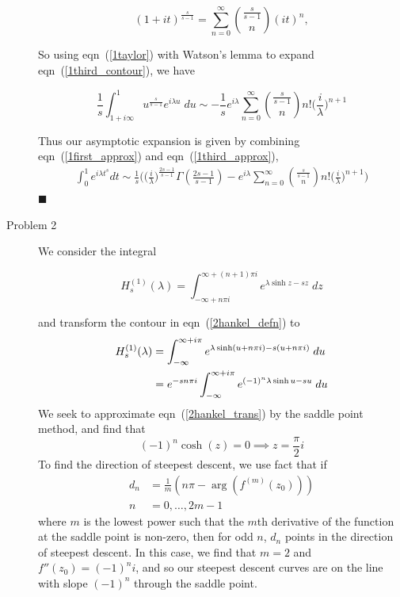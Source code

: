 \documentclass[11pt]{article}
\newcommand{\eq}[1]{\begin{align*}#1\end{align*}}
\newcommand{\eqn}[2]{
  \begin{equation}
    \label{#1}
    #2
  \end{equation}
}
\newcommand{\lam}{\lambda}
\newcommand{\eqr}[1]{eqn~(\ref{#1})}
\begin{document}
\begin{description}
\eqn{1taylor}{
  (1 + it)^\frac{s}{s-1} = 
  \sum_{n=0}^\infty
  \binom{\frac{s}{s-1}}{n}
  (it)^n,
}
So using \eqr{1taylor} with Watson's lemma to expand \eqr{1third_contour}, we have
\eqn{1third_approx}{
  \frac{1}{s} \int_{1+i\infty}^{1} u^\frac{s}{s-1} e^{i\lam u} \; du
  \sim
  -\frac{1}{s}
  e^{i\lam}
  \sum_{n=0}^\infty
  \binom{\frac{s}{s-1}}{n}
  n!
  \bigg(\frac{i}{\lam}\bigg)^{n+1}
}
Thus our asymptotic expansion is given by combining \eqr{1first_approx} and \eqr{1third_approx},
\eq{
  \int_0^1 e^{i\lam t^s} dt
  \sim
  \frac{1}{s}
  \Bigg(
    \bigg(\frac{i}{\lam}\bigg)^\frac{2s-1}{s-1}
    \Gamma(
      \frac{2s-1}{s-1}
    )
    -
    e^{i\lam}
    \sum_{n=0}^\infty
    \binom{\frac{s}{s-1}}{n}
    n!
    \bigg(\frac{i}{\lam}\bigg)^{n+1}
  \Bigg)
}
\hfill $\blacksquare$
\item[Problem 2]
We consider the integral
\eqn{2hankel_defn}{
  H_s^{(1)}(\lam) = \int_{
    -\infty + n\pi i
  }^{
    \infty + (n+1)\pi i
  }
  e^{
    \lam\sinh z - sz
  }
  \; dz
}
and transform the contour in \eqr{2hankel_defn} to
\begin{align}
  \notag
  H_s^{(1)}(\lam) &= \int
  _{-\infty}
  ^{\infty + i\pi}
  e^{
    \lam \sinh(u + n\pi i) - s(u + n\pi i)
  }
  \; du
  \\
  \label{2hankel_trans}
  &=
  e^{-sn\pi i}
  \int
  _{-\infty}
  ^{\infty + i\pi}
  e^{
    (-1)^n \lam \sinh u - su
  }
  \; du
\end{align}
We seek to approximate \eqr{2hankel_trans} by the saddle point method,
and find that
$$
  (-1)^n \cosh(z) = 0 \implies z = \frac{\pi}{2}i
$$
To find the direction of steepest descent, we use fact that if
\eq{
  d_n &= \frac{1}{m}(n\pi - \arg(f^{(m)}(z_0))) \\
  n &= 0, \ldots, 2m-1
}
where $m$ is the lowest power such that the $m$th derivative of the function at the saddle point is
non-zero, then for odd $n$, $d_n$ points in the direction of steepest descent.
In this case, we find that $m = 2$ and $f''(z_0) = (-1)^n i$, and so our steepest
descent curves are on the line with slope $(-1)^n$ through the saddle point.


\end{description}
\end{document}
